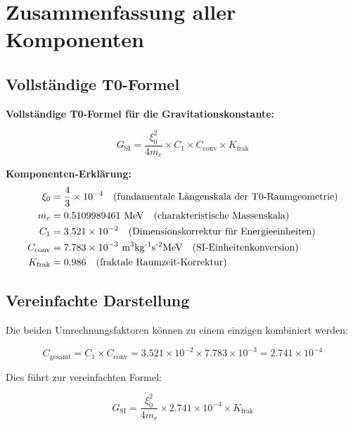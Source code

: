 \documentclass[12pt,a4paper]{article}
\begin{document}
	\section{Zusammenfassung aller Komponenten}
	
	\subsection{Vollständige T0-Formel}
	
	\begin{keyresult}
		\textbf{Vollständige T0-Formel für die Gravitationskonstante:}
		
		\begin{equation}
			\boxed{G_{\text{SI}} = \frac{\xi_0^2}{4 m_e} \times C_1 \times C_{\text{conv}} \times K_{\text{frak}}}
			\label{eq:G_complete_detailed}
		\end{equation}
		
		\textbf{Komponenten-Erklärung:}
		\begin{align}
			\xi_0 &= \frac{4}{3} \times 10^{-4} \quad \text{(fundamentale Längenskala der T0-Raumgeometrie)} \\
			m_e &= 0.5109989461 \text{ MeV} \quad \text{(charakteristische Massenskala)} \\
			C_1 &= 3.521 \times 10^{-2} \quad \text{(Dimensionskorrektur für Energieeinheiten)} \\
			C_{\text{conv}} &= 7.783 \times 10^{-3} \text{ m\textsuperscript{3}kg\textsuperscript{-1}s\textsuperscript{-2}MeV} \quad \text{(SI-Einheitenkonversion)} \\
			K_{\text{frak}} &= 0.986 \quad \text{(fraktale Raumzeit-Korrektur)}
		\end{align}
	\end{keyresult}
	
	\subsection{Vereinfachte Darstellung}
	
	Die beiden Umrechnungsfaktoren können zu einem einzigen kombiniert werden:
	
	\begin{equation}
		C_{\text{gesamt}} = C_1 \times C_{\text{conv}} = 3.521 \times 10^{-2} \times 7.783 \times 10^{-3} = 2.741 \times 10^{-4}
	\end{equation}
	
	Dies führt zur vereinfachten Formel:
	
	\begin{equation}
		\boxed{G_{\text{SI}} = \frac{\xi_0^2}{4 m_e} \times 2.741 \times 10^{-4} \times K_{\text{frak}}}
	\end{equation}
	
\end{document}
